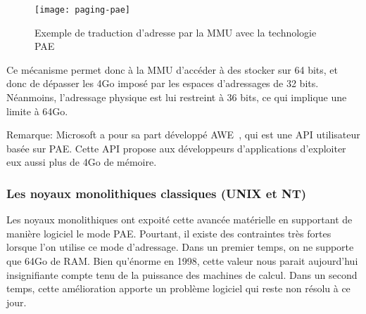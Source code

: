       \begin{figure}[h]
        \centering \texttt{[image: paging-pae]}
        \caption{Exemple de traduction d'adresse par la MMU avec la technologie
          PAE}
        \label{fig:paging-pae}
      \end{figure}
      
      Ce mécanisme permet donc à la MMU d'accéder à des stocker sur 64 bits, et
      donc de dépasser les 4Go imposé par les espaces d'adressages de 32
      bits. Néanmoins, l'adressage physique est lui restreint à 36 bits, ce qui
      implique une limite à 64Go.

      \begin{paragraph}{Remarque:}
        Microsoft a pour sa part développé AWE~\citep{russinovich2012windows},
        qui est une API utilisateur basée sur PAE. Cette API propose aux
        développeurs d'applications d'exploiter eux aussi plus de 4Go de
        mémoire.\newline
      \end{paragraph}


    \subsubsection{}





    \subsubsection{Les noyaux monolithiques classiques (UNIX et NT)}

      Les noyaux monolithiques ont expoité cette avancée matérielle en
      supportant de manière logiciel le mode PAE. Pourtant, il existe des
      contraintes très fortes lorsque l'on utilise ce mode d'adressage. Dans un
      premier temps, on ne supporte que 64Go de RAM. Bien qu'énorme en 1998,
      cette valeur nous parait aujourd'hui insignifiante compte tenu de la
      puissance des machines de calcul.  Dans un second temps, cette
      amélioration apporte un problème logiciel qui reste non résolu à ce
      jour.\newline

